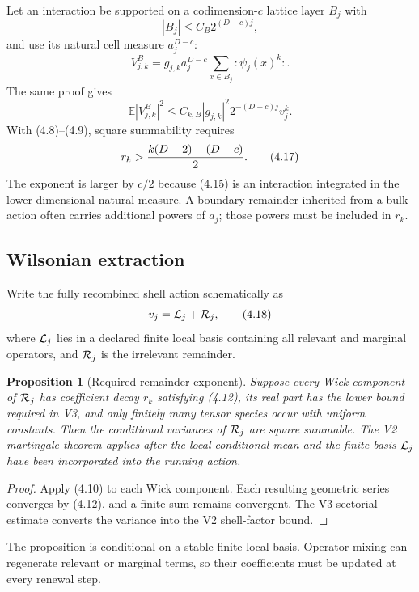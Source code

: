 \documentclass[11pt]{article}
\newtheorem{proposition}[theorem]{Proposition}
\theoremstyle{remark}
\begin{document}
Let an interaction be supported on a codimension-\(c\) lattice layer
\(B_j\) with
\[
                              |B_j|\le C_B2^{(D-c)j},         \tag{4.14}
\]
and use its natural cell measure \(a_j^{D-c}\):
\[
 V_{j,k}^{B}=g_{j,k}a_j^{D-c}
        \sum_{x\in B_j}:\!\psi_j(x)^k\!:.                    \tag{4.15}
\]
The same proof gives
\[
 \mathbb E|V_{j,k}^{B}|^2
 \le C_{k,B}|g_{j,k}|^2
       2^{-(D-c)j}v_j^k.                                    \tag{4.16}
\]
With (4.8)--(4.9), square summability requires
\[
                              r_k>{k(D-2)-(D-c)\over2}.       \tag{4.17}
\]
The exponent is larger by \(c/2\) because (4.15) is an interaction
integrated in the lower-dimensional natural measure.  A boundary
remainder inherited from a bulk action often carries additional
powers of \(a_j\); those powers must be included in \(r_k\).

\subsection{Wilsonian extraction}

Write the fully recombined shell action schematically as
\[
                              v_j={\cal L}_j+{\cal R}_j,      \tag{4.18}
\]
where \({\cal L}_j\) lies in a declared finite local basis containing
all relevant and marginal operators, and \({\cal R}_j\) is the
irrelevant remainder.

\begin{proposition}[Required remainder exponent]
\label{prop:v12v4-remainder}
Suppose every Wick component of \({\cal R}_j\) has coefficient decay
\(r_k\) satisfying (4.12), its real part has the lower bound required
in V3, and only finitely many tensor species occur with uniform
constants.  Then the conditional variances of \({\cal R}_j\) are
square summable.  The V2 martingale theorem applies after the local
conditional mean and the finite basis \({\cal L}_j\) have been
incorporated into the running action.
\end{proposition}

\begin{proof}
Apply (4.10) to each Wick component.  Each resulting geometric series
converges by (4.12), and a finite sum remains convergent.  The V3
sectorial estimate converts the variance into the V2 shell-factor
bound.
\end{proof}

The proposition is conditional on a stable finite local basis.
Operator mixing can regenerate relevant or marginal terms, so their
coefficients must be updated at every renewal step.
\end{document}
